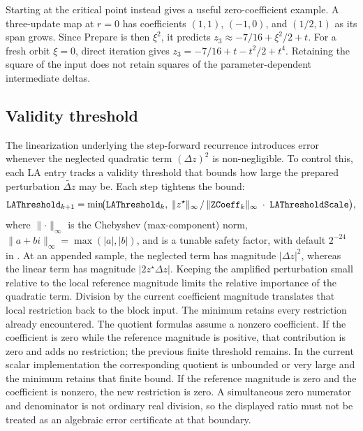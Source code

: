 Starting at the critical point instead gives a useful zero-coefficient example.
A three-update map at $r=0$ has coefficients $(1,1)$, $(-1,0)$, and
$(1/2,1)$ as its span grows. Since Prepare is then $\xi^2$, it predicts
$z_3\approx-7/16+\xi^2/2+t$. For a fresh orbit $\xi=0$, direct iteration
gives $z_3=-7/16+t-t^2/2+t^4$. Retaining the square of the input does not
retain squares of the parameter-dependent intermediate deltas.

\subsection{Validity threshold}
\label{sec:la-threshold}

The linearization underlying the step-forward recurrence introduces error
whenever the neglected quadratic term \((\Delta z)^2\) is non-negligible.
To control this, each LA entry tracks a validity threshold
 that bounds how large the prepared perturbation
\(\tilde{\Delta z}\) may be.  Each step tightens the bound:
\begin{equation}
\texttt{LAThreshold}_{k+1}
  = \min\!\bigl(
      \texttt{LAThreshold}_k,\;
      \lVert z^\star\rVert_\infty \,/\,
      \lVert\texttt{ZCoeff}_k\rVert_\infty
      \;\cdot\;\texttt{LAThresholdScale}
    \bigr),
\label{eq:la-threshold}
\end{equation}
where \(\lVert\cdot\rVert_\infty\) is the Chebyshev (max-component) norm,
\(\lVert a + bi \rVert_\infty = \max(|a|, |b|)\), and
 is a tunable safety factor, with default
$2^{-24}$ in . At an appended sample, the neglected
term has magnitude $|\Delta z|^2$, whereas the linear term has
magnitude $|2z^\star\Delta z|$. Keeping the amplified perturbation
small relative to the local reference magnitude limits the relative
importance of the quadratic term. Division by the current coefficient
magnitude translates that local restriction back to the block input.
The minimum retains every restriction already encountered.
The quotient formulas assume a nonzero coefficient. If the coefficient is
zero while the reference magnitude is positive, that contribution is zero and
adds no restriction; the previous finite threshold remains. In the current
scalar implementation the corresponding quotient is unbounded or very large
and the minimum retains that finite bound. If the reference magnitude is zero
and the coefficient is nonzero, the new restriction is zero. A simultaneous
zero numerator and denominator is not ordinary real division, so the displayed
ratio must not be treated as an algebraic error certificate at that boundary.

